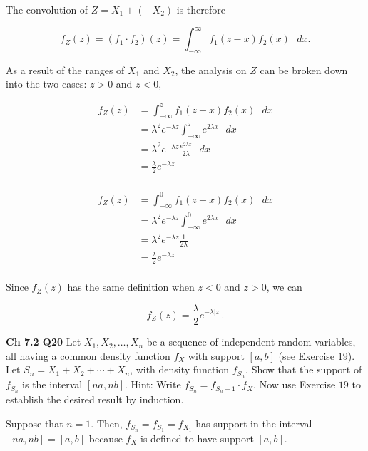 \documentclass[12pt]{article}
\begin{document}
\noindent
The convolution of $Z = X_1 + (-X_2)$ is therefore

\begin{equation*}
f_Z(z) = (f_1 \cdot f_2)(z) = \int_{- \infty}^{\infty} f_1(z - x)f_2(x) \text{ } dx.
\end{equation*}

\noindent
As a result of the ranges of $X_1$ and $X_2$, the analysis on $Z$ can be broken down into the two cases: $z > 0$ and $z < 0$,

\begin{align*}
f_Z(z) &= \int_{- \infty}^{z} f_1(z - x)f_2(x) \text{ } dx \\
&= \lambda^2 e^{- \lambda z} \int_{- \infty}^{z} e^{2 \lambda x} \text{ } dx  \\
&= \lambda^2 e^{- \lambda z} \frac{e^{2 \lambda x}}{2 \lambda}  \text{ } dx  \\
&= \frac{\lambda}{2} e^{- \lambda z} \\
\end{align*}

\begin{align*}
f_Z(z) &= \int_{- \infty}^{0} f_1(z - x)f_2(x) \text{ } dx \\
&= \lambda^2 e^{- \lambda z} \int_{- \infty}^{0} e^{2 \lambda x} \text{ } dx  \\
&= \lambda^2 e^{- \lambda z} \frac{1}{2 \lambda}  \\
&= \frac{\lambda}{2} e^{- \lambda z}  \\
\end{align*}

\noindent
Since $f_Z(z)$ has the same definition when $z < 0$ and $z > 0$, we can 

\begin{equation*}
f_Z(z) = \frac{\lambda}{2} e^{- \lambda \lvert z \rvert }.
\end{equation*}

\vspace*{.5cm}
\noindent
\textbf{Ch 7.2 Q20} Let $X_1, X_2, \ldots , X_n$ be a sequence of independent random variables, all having a common density function $f_X$ with support $[a, b]$ (see Exercise $19$). Let $S_n = X_1 + X_2 + \cdots + X_n$, with density function $f_{S_n}$. Show that the support of $f_{S_n}$ is the interval $[na, nb]$. Hint: Write $f_{S_n} = f_{S_n-1} \cdot f_X$. Now use Exercise $19$ to establish the desired result by induction.

\vspace*{.5cm}
\noindent
Suppose that $n=1$. Then, $f_{S_n} = f_{S_1} = f_{X_1}$ has support in the interval $[na, nb] = [a,b]$ because $f_X$ is defined to have support $[a, b]$. 
\end{document}
